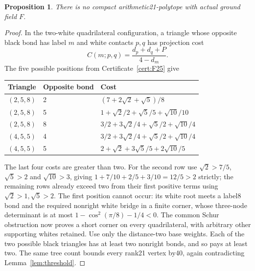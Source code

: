 \documentclass[11pt]{article}
\newtheorem{proposition}[theorem]{Proposition}
\begin{document}
\begin{proposition}\label{prop:F25}
There is no compact arithmetic21-polytope with actual ground field $F$.
\end{proposition}
\begin{proof}
In the two-white quadrilateral configuration, a triangle whose opposite
black bond has label $m$ and white contacts $p,q$ has projection cost
\[
 C(m;p,q)=\frac{d_p+d_q+P}{4-d_m}.
\]
The five possible positions from Certificate~\ref{cert:F25} give
\begin{center}\small
\begin{tabular}{lll}\toprule
Triangle&Opposite bond&Cost\\\midrule
$(2,5,8)$&2&$(7+2\sqrt2+\sqrt5)/8$\\
$(2,5,8)$&5&$1+\sqrt2/2+\sqrt5/5+\sqrt{10}/10$\\
$(2,5,8)$&8&$3/2+3\sqrt2/4+\sqrt5/2+\sqrt{10}/4$\\
$(4,5,5)$&4&$3/2+3\sqrt2/4+\sqrt5/2+\sqrt{10}/4$\\
$(4,5,5)$&5&$2+\sqrt2+3\sqrt5/5+2\sqrt{10}/5$\\\bottomrule
\end{tabular}
\end{center}
The last four costs are greater than two. For the second row use
$\sqrt2>7/5$, $\sqrt5>2$ and $\sqrt{10}>3$, giving
$1+7/10+2/5+3/10=12/5>2$ strictly; the remaining rows already exceed two
from their first positive terms using $\sqrt2>1,\sqrt5>2$.
The first
position cannot occur: its white root meets a label8 bond and the
required nonright white bridge in a finite corner, whose three-node
determinant is at most $1-\cos^2(\pi/8)-1/4<0$.
The common Schur obstruction now proves a short corner on every
quadrilateral, with arbitrary other supporting whites retained.
Use only the distance-two base weights. Each of the two possible
black triangles has at least two nonright bonds, and so pays at least
two. The same tree count bounds every rank21 vertex by40, again
contradicting Lemma~\ref{lem:threshold}.
\end{proof}
\end{document}
